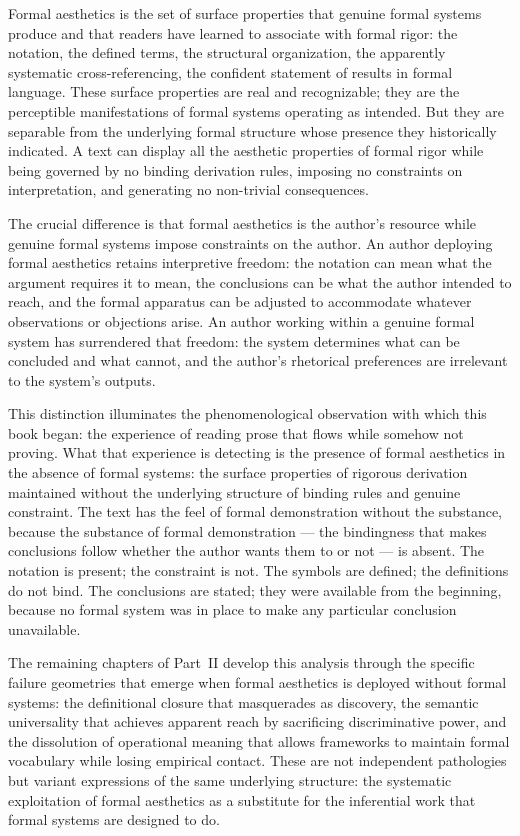 \documentclass[12pt, openright, twoside]{book}
\begin{document}
Formal aesthetics is the set of surface properties that genuine
formal systems produce and that readers have learned to associate
with formal rigor: the notation, the defined terms, the structural
organization, the apparently systematic cross-referencing, the
confident statement of results in formal language. These surface
properties are real and recognizable; they are the perceptible
manifestations of formal systems operating as intended. But they
are separable from the underlying formal structure whose presence
they historically indicated. A text can display all the aesthetic
properties of formal rigor while being governed by no binding
derivation rules, imposing no constraints on interpretation, and
generating no non-trivial consequences.

The crucial difference is that formal aesthetics is the author's
resource while genuine formal systems impose constraints on the
author. An author deploying formal aesthetics retains interpretive
freedom: the notation can mean what the argument requires it to
mean, the conclusions can be what the author intended to reach,
and the formal apparatus can be adjusted to accommodate whatever
observations or objections arise. An author working within a
genuine formal system has surrendered that freedom: the system
determines what can be concluded and what cannot, and the author's
rhetorical preferences are irrelevant to the system's outputs.

This distinction illuminates the phenomenological observation with
which this book began: the experience of reading prose that flows
while somehow not proving. What that experience is detecting is
the presence of formal aesthetics in the absence of formal systems:
the surface properties of rigorous derivation maintained without
the underlying structure of binding rules and genuine constraint.
The text has the feel of formal demonstration without the substance,
because the substance of formal demonstration --- the bindingness
that makes conclusions follow whether the author wants them to or
not --- is absent. The notation is present; the constraint is not.
The symbols are defined; the definitions do not bind. The conclusions
are stated; they were available from the beginning, because no
formal system was in place to make any particular conclusion
unavailable.

The remaining chapters of Part~II develop this analysis through
the specific failure geometries that emerge when formal aesthetics
is deployed without formal systems: the definitional closure that
masquerades as discovery, the semantic universality that achieves
apparent reach by sacrificing discriminative power, and the
dissolution of operational meaning that allows frameworks to
maintain formal vocabulary while losing empirical contact. These
are not independent pathologies but variant expressions of the
same underlying structure: the systematic exploitation of formal
aesthetics as a substitute for the inferential work that formal
systems are designed to do.
\end{document}
